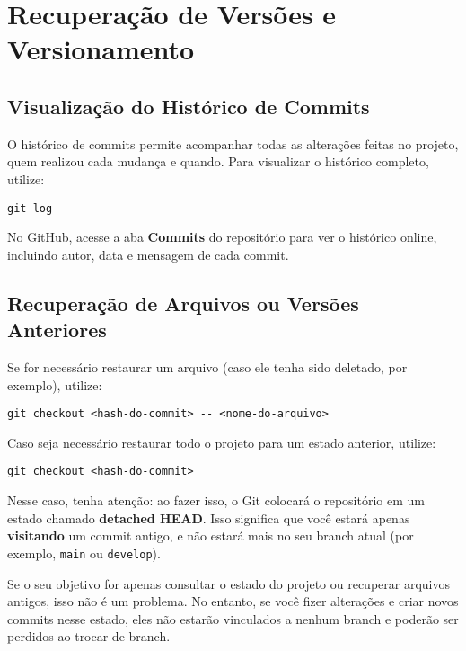 \newpage

\section{Recuperação de Versões e Versionamento}

\subsection{Visualização do Histórico de Commits}

O histórico de commits permite acompanhar todas as alterações feitas no projeto, quem realizou cada mudança e quando. Para visualizar o histórico completo, utilize:

\begin{lstlisting}[style=shellstyle]
git log
\end{lstlisting}

No GitHub, acesse a aba \textbf{Commits} do repositório para ver o histórico online, incluindo autor, data e mensagem de cada commit.

\subsection{Recuperação de Arquivos ou Versões Anteriores}

Se for necessário restaurar um arquivo (caso ele tenha sido deletado, por exemplo), utilize:

\begin{lstlisting}[style=shellstyle]
git checkout <hash-do-commit> -- <nome-do-arquivo>
\end{lstlisting}

Caso seja necessário restaurar todo o projeto para um estado anterior, utilize:

\begin{lstlisting}[style=shellstyle]
git checkout <hash-do-commit>
\end{lstlisting}

Nesse caso, tenha atenção: ao fazer isso, o Git colocará o repositório em um estado chamado \textbf{detached HEAD}. Isso significa que você estará apenas \textbf{visitando} um commit antigo, e não estará mais no seu branch atual (por exemplo, \texttt{main} ou \texttt{develop}).  

Se o seu objetivo for apenas consultar o estado do projeto ou recuperar arquivos antigos, isso não é um problema. No entanto, se você fizer alterações e criar novos commits nesse estado, eles não estarão vinculados a nenhum branch e poderão ser perdidos ao trocar de branch.  

